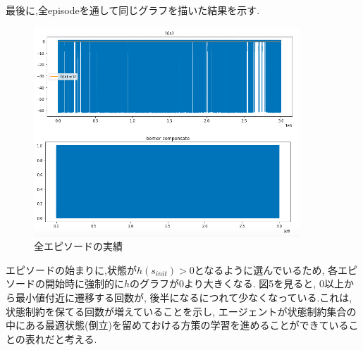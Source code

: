 \documentclass{jsarticle}
\begin{document}
最後に,全episodeを通して同じグラフを描いた結果を示す. \par
\begin{figure}[h]
	\centering
 	\includegraphics[width=10cm]{all_policies2.png}
 	\caption{全エピソードの実績}
\end{figure}\par

エピソードの始まりに,状態が$h(s_{init})>0$となるように選んでいるため, 各エピソードの開始時に強制的に$h$のグラフが0より大きくなる. 図5を見ると, 0以上から最小値付近に遷移する回数が, 後半になるにつれて少なくなっている.これは, 状態制約を保てる回数が増えていることを示し, エージェントが状態制約集合の中にある最適状態(倒立)を留めておける方策の学習を進めることができていることの表れだと考える. \par
\end{document}
